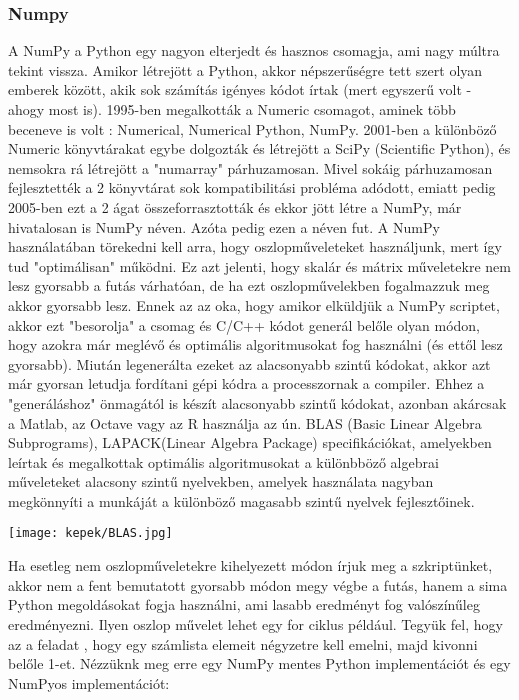 \documentclass{article}
\theoremstyle{definition}
\theoremstyle{theorem}
\begin{document}
\subsubsection{Numpy}
A NumPy a Python egy nagyon elterjedt és hasznos csomagja, ami nagy múltra tekint vissza. Amikor létrejött a Python, akkor  népszerűségre tett szert olyan emberek között, akik sok számítás igényes kódot írtak (mert egyszerű volt - ahogy most is). 1995-ben megalkották a Numeric csomagot, aminek több beceneve is volt : Numerical, Numerical Python, NumPy. 2001-ben a különböző Numeric könyvtárakat egybe dolgozták és létrejött a SciPy (Scientific Python), és nemsokra rá létrejött a "numarray" párhuzamosan. Mivel sokáig párhuzamosan fejlesztették a 2 könyvtárat sok kompatibilitási probléma adódott, emiatt pedig 2005-ben ezt a 2 ágat összeforrasztották és ekkor jött létre a NumPy, már hivatalosan is NumPy néven. Azóta pedig ezen a néven fut. A NumPy használatában törekedni kell arra, hogy oszlopműveleteket használjunk, mert így tud "optimálisan" működni. Ez azt jelenti, hogy skalár és mátrix műveletekre nem lesz gyorsabb a futás várhatóan, de ha ezt oszlopművelekben fogalmazzuk meg akkor gyorsabb lesz. Ennek az az oka, hogy amikor elküldjük a NumPy scriptet, akkor ezt "besorolja" a csomag és C/C++ kódot generál belőle olyan módon, hogy azokra már meglévő és optimális algoritmusokat fog használni (és ettől lesz gyorsabb). Miután legenerálta ezeket az alacsonyabb szintű kódokat, akkor azt már gyorsan letudja fordítani gépi kódra a processzornak a compiler. Ehhez a "generáláshoz" önmagától is készít alacsonyabb szintű kódokat, azonban akárcsak a Matlab, az Octave vagy az R használja az ún. BLAS (Basic Linear Algebra Subprograms), LAPACK(Linear Algebra Package) specifikációkat, amelyekben leírtak és megalkottak optimális algoritmusokat a különbböző algebrai műveleteket alacsony szintű nyelvekben, amelyek használata nagyban megkönnyíti a munkáját a különböző magasabb szintű nyelvek fejlesztőinek.
\begin{center}
    \texttt{[image: kepek/BLAS.jpg]}
\end{center}
Ha esetleg nem oszlopműveletekre kihelyezett módon írjuk meg a szkriptünket, akkor nem a fent bemutatott gyorsabb módon megy végbe a futás, hanem a sima Python megoldásokat fogja használni, ami lasabb eredményt fog valószínűleg eredményezni.\newline
Ilyen oszlop művelet lehet egy for ciklus például. Tegyük fel, hogy az a feladat , hogy egy számlista elemeit négyzetre kell emelni, majd kivonni belőle 1-et. Nézzüknk meg erre egy NumPy mentes Python implementációt és egy NumPyos implementációt:
\end{document}
